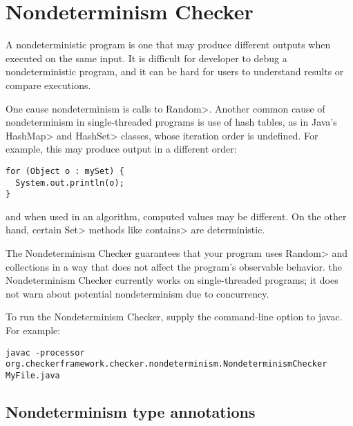 \htmlhr
\chapter{Nondeterminism Checker\label{nondeterminism-checker}}

A nondeterministic program is one that may produce different outputs when
executed on the same input.  It is difficult for developer to debug a
nondeterministic program, and it can be hard for users to understand
results or compare executions.

One cause nondeterminism is calls to \<Random>.
Another common cause of nondeterminism in single-threaded programs is use
of hash tables, as in Java's \<HashMap> and \<HashSet> classes, whose
iteration order is undefined.  For example, this may produce output in a
different order:

\begin{Verbatim}
for (Object o : mySet) {
  System.out.println(o);
}
\end{Verbatim}

\noindent
and when used in an algorithm, computed values may be different.
On the other hand, certain \<Set> methods like \<contains> are deterministic.

The Nondeterminism Checker guarantees that
your program uses \<Random> and collections in a way that does not affect
the program's observable behavior.
the Nondeterminism Checker currently works on single-threaded programs;
it does not warn about potential nondeterminism due to concurrency.

To run the Nondeterminism Checker, supply the
command-line option to javac.
For example:

\begin{Verbatim}
javac -processor org.checkerframework.checker.nondeterminism.NondeterminismChecker MyFile.java
\end{Verbatim}


\section{Nondeterminism type annotations\label{nondeterminism-annotations}}

